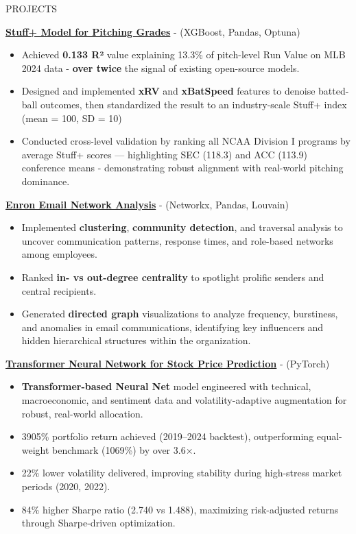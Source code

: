\documentclass{resume3}
\begin{document}
\begin{rSection}{PROJECTS}

\vspace{0.15cm}

{\underline{{\bf Stuff+ Model for Pitching Grades}}} - (XGBoost, Pandas, Optuna)
\begin{itemize}
\item Achieved \textbf{0.133 R²} value explaining 13.3\% of pitch-level Run Value on MLB 2024 data - \textbf{over twice} the signal of existing open-source models.
\item Designed and implemented \textbf{xRV} and \textbf{xBatSpeed} features to denoise batted-ball outcomes, then standardized the result to an industry-scale Stuff+ index (mean = 100, SD = 10)
\item Conducted cross-level validation by ranking all NCAA Division I programs by average Stuff+ scores — highlighting SEC (118.3) and ACC (113.9) conference means - demonstrating robust alignment with real-world pitching dominance.
\end{itemize}

  {\underline{{\bf Enron Email Network Analysis}}} - (Networkx, Pandas, Louvain)
\begin{itemize}
\item Implemented \textbf{clustering}, \textbf{community detection}, and traversal analysis to uncover communication patterns, response times, and role-based networks among employees.
\item Ranked \textbf{in- vs out-degree centrality} to spotlight prolific senders and central recipients.
\item Generated \textbf{directed graph} visualizations to analyze frequency, burstiness, and anomalies in email communications, identifying key influencers and hidden hierarchical structures within the organization.
\end{itemize}


{\underline{{\bf Transformer Neural Network for Stock Price Prediction}}} - (PyTorch)
\begin{itemize}
\item \textbf{Transformer-based Neural Net} model engineered with technical, macroeconomic, and sentiment data and volatility-adaptive augmentation for robust, real-world allocation.
\item 3905\% portfolio return achieved (2019–2024 backtest), outperforming equal-weight benchmark (1069\%) by over 3.6×.
\item 22\% lower volatility delivered, improving stability during high-stress market periods (2020, 2022).
\item 84\% higher Sharpe ratio (2.740 vs 1.488), maximizing risk-adjusted returns through Sharpe-driven optimization.
\end{itemize}


\end{rSection}
\end{document}
